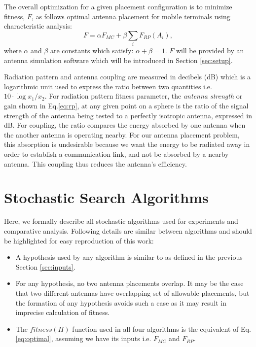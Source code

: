 \documentclass{sig-alternate}
\begin{document}
The overall optimization for a given placement configuration is to minimize fitness, $F$, as follows optimal antenna placement for mobile terminals using characteristic analysis:
\begin{equation} \label{eq:optimal}
  F = \alpha F_{MC} + \beta \sum_{i} F_{RP}(A_i),
\end{equation}
where $\alpha$ and $\beta$ are constants which satisfy: $\alpha + \beta = 1$. $F$ will be provided by an antenna simulation software which will be introduced in Section \ref{sec:setup}.

Radiation pattern and antenna coupling are measured in decibels (dB) which is a logarithmic unit used to express the ratio between two quantities i.e. $10 \cdot \log{x_1 / x_2}$. For radiation pattern fitness parameter, the \textit{antenna strength} or gain shown in Eq.\eqref{eq:rp}, at any given point on a sphere is the ratio of the signal strength of the antenna being tested to a perfectly isotropic antenna, expressed in dB. For coupling, the ratio compares the energy absorbed by one antenna when the another antenna is operating nearby.  For our antenna placement problem, this absorption is undesirable because we want the energy to be radiated away in order to establish a communication link, and not be absorbed by a nearby antenna.  This coupling thus reduces the antenna's efficiency.  

\section{Stochastic Search Algorithms}
\label{sec:algorithms}
Here, we formally describe all stochastic algorithms used for experiments and comparative analysis. Following details are similar between algorithms and should be highlighted for easy reproduction of this work:
\begin{itemize}
    \item A hypothesis used by any algorithm is similar to as defined in the previous Section \ref{sec:inputs}.
    \item For any hypothesis, no two antenna placements overlap. It may be the case that two different antennas have overlapping set of allowable placements, but the formation of any hypothesis avoids such a case as it may result in imprecise calculation of fitness.
    \item The $fitness(H)$ function used in all four algorithms is the equivalent of Eq.\eqref{eq:optimal}, assuming we have its inputs i.e. $F_{MC}$ and $F_{RP}$.
\end{itemize}
\end{document}

